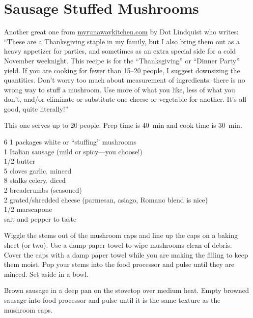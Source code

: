 \section{Sausage Stuffed Mushrooms}

\begin{open}
    Another great one from \url{myrunawaykitchen.com} by Dot Lindquist who writes: ``These are a Thanksgiving staple in my family, but I also bring them out as a heavy appetizer for parties, and sometimes as an extra special side for a cold November weeknight.  This recipe is for the ``Thanksgiving'' or ``Dinner Party'' yield.  If you are cooking for fewer than \numrange{15}{20} people, I suggest downsizing the quantities.  Don’t worry too much about measurement of ingredients: there is no wrong way to stuff a mushroom.  Use more of what you like, less of what you don't, and/or eliminate or substitute one cheese or vegetable for another.  It's all good, quite literally!''

    This one serves up to 20 people.  Prep time is \SI{40}{\minute} and cook time is \SI{30}{\minute}.
\end{open}
\begin{ingredients}
    6 \SI{1}{\quart} packages white or ``stuffing'' mushrooms\\
    \SI{1}{\pound} Italian sausage (mild or spicy---you choose!)\\
    \SI{1/2}{\cup} butter\\
    5 cloves garlic, minced\\
    8 stalks celery, diced\\
    \SI{2}{\cup} breadcrumbs (seasoned)\\
    \SI{2}{\cup} grated/shredded cheese (parmesan, asiago, Romano blend is
    nice)\\
    \SI{1/2}{\cup} marscapone\\
    salt and pepper to taste
\end{ingredients}
Wiggle the stems out of the mushroom caps and line up the caps on a baking sheet
(or two). Use a damp paper towel to wipe mushrooms clean of debris. Cover the
caps with a damp paper towel while you are making the filling to keep them
moist. Pop your stems into the food processor and pulse until they are minced.
Set aside in a bowl.

Brown sausage in a deep pan on the stovetop over medium heat. Empty browned
sausage into food processor and pulse until it is the same texture as the
mushroom caps.

